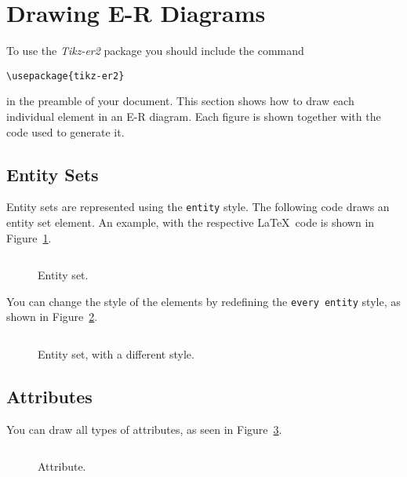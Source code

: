 \documentclass[12pt]{article}
\newcommand{\demo}[1]{
  \bigskip
  \begin{minipage}{\linewidth}
      \begin{center}
          
      \end{center}
      \begin{center}
          \scriptsize
          \inputminted{latex}{snippets/#1.tex}
      \end{center}
  \end{minipage}
}
\begin{document}
\section{Drawing E-R Diagrams}
\label{sec:drawing-e-r}

To use the \emph{Tikz-er2} package you should include the command
\begin{center}
    \ttfamily
    \verb+\usepackage{tikz-er2}+
\end{center}
in the preamble of your document. This section shows how to draw each individual
element in an E-R diagram. Each figure is shown together with the code used to
generate it.

%

\subsection{Entity Sets}
\label{sec:entities}

Entity sets are represented using the \texttt{entity} style. The following code
draws an entity set element. An example, with the respective \LaTeX\ code is
shown in Figure~\ref{fig:entity}.

\begin{figure}[htb!]
    \centering
    \demo{entity}
    \caption{Entity set.}
\label{fig:entity}
\end{figure}

You can change the style of the elements by redefining the \texttt{every
  entity} style, as shown in Figure~\ref{fig:entity-blue}.

\begin{figure}[htb!]
    \centering
    \demo{entity-blue}
    \caption{Entity set, with a different style.}
\label{fig:entity-blue}
\end{figure}

%

\subsection{Attributes}
\label{sec:attributes}

You can draw all types of attributes, as seen in Figure~\ref{fig:attribute}.

\begin{figure}[htb!]
    \centering
    \demo{attribute}
    \caption{Attribute.}
\label{fig:attribute}
\end{figure}
\end{document}
